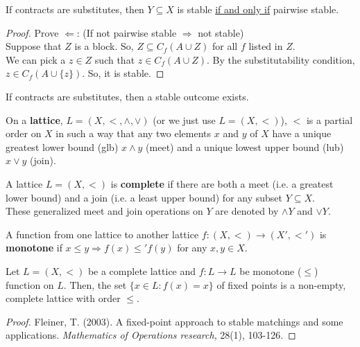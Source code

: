 \documentclass[11pt]{elegantbook}
\begin{document}
\begin{theorem}
    If contracts are substitutes, then $Y\subseteq X$ is stable \underline{if and only if} pairwise stable.
\end{theorem}
\begin{proof}
    Prove $\Leftarrow$:
    (If not pairwise stable $\Rightarrow$ not stable)\\
    Suppose that $Z$ is a block. So, $Z\subseteq C_f(A\cup Z)$ for all $f$ listed in $Z$.\\
    We can pick a $z\in Z$ such that $z\in C_f(A\cup Z)$. By the substitutability condition, $z\in C_f(A\cup \{z\})$. So, it is stable.
\end{proof}

\begin{theorem}
    If contracts are substitutes, then a stable outcome exists.
\end{theorem}

\begin{definition}[Lattice]
    \normalfont
    On a \textbf{lattice}, $L=(X,<,\wedge,\vee)$ (or we just use $L=(X,<)$), $<$ is a partial order on $X$ in such a way that any two elements $x$ and $y$ of $X$ have a unique greatest lower bound (glb) $x \wedge y$ (meet) and a unique lowest upper bound (lub) $x \vee y$ (join).
\end{definition}



\begin{definition}
    \normalfont
    A lattice $L=(X,<)$ is \textbf{complete} if there are both a meet (i.e. a greatest lower bound) and a join (i.e. a least upper bound) for any subset $Y\subseteq X$.\\
    These generalized meet and join operations on $Y$ are denoted by $\wedge Y$ and $\vee Y$.
\end{definition}

\begin{definition}
    \normalfont
    A function from one lattice to another lattice $f:(X,<) \rightarrow (X',<')$ is \textbf{monotone} if $x\leq y \Rightarrow f(x)\leq' f(y)$ for any $x,y\in X$.
\end{definition}

\begin{theorem}[Tarski 1955]
    Let $L=(X,<)$ be a complete lattice and $f: L \rightarrow L$ be monotone ($\leq$) function on $L$. Then, the set $\{x\in L: f(x)=x\}$ of fixed points is a non-empty, complete lattice with order $\leq$.
\end{theorem}
\begin{proof}
    Fleiner, T. (2003). A fixed-point approach to stable matchings and some applications. \textit{Mathematics of Operations research}, 28(1), 103-126.
\end{proof}
\end{document}
